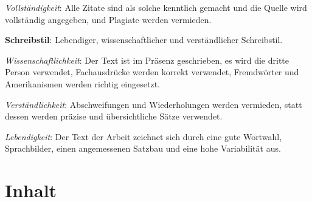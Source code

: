 \begin{checklist}
\begin{checklist}
        \item \textit{Vollständigkeit}: Alle Zitate sind als solche kenntlich gemacht und die Quelle wird vollständig angegeben, und Plagiate werden vermieden.
    \end{checklist}
  \item \textbf{Schreibstil}: Lebendiger, wissenschaftlicher und verständlicher Schreibstil.
    \begin{checklist}
        \item \textit{Wissenschaftlichkeit}: Der Text ist im Präsenz geschrieben, es wird die dritte Person verwendet, Fachausdrücke werden korrekt verwendet, Fremdwörter und Amerikanismen werden richtig eingesetzt.
        \item \textit{Verständlichkeit}: Abschweifungen und Wiederholungen werden vermieden, statt dessen werden präzise und übersichtliche Sätze verwendet.
        \item \textit{Lebendigkeit}: Der Text der Arbeit zeichnet sich durch eine gute Wortwahl, Sprachbilder, einen angemessenen Satzbau und eine hohe Variabilität aus.
    \end{checklist}
\end{checklist}

\section{Inhalt}

